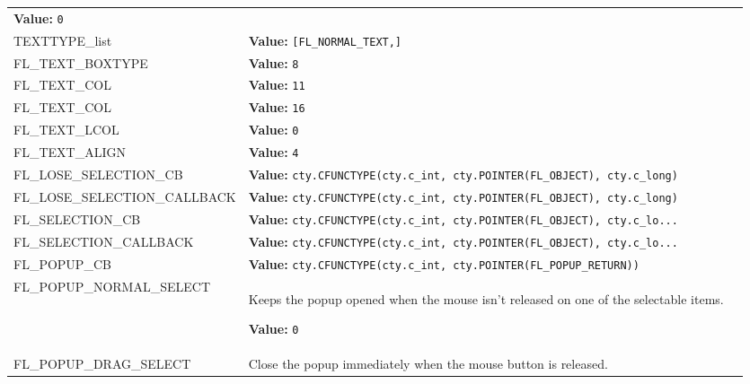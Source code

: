 \begin{longtable}{|p{\varnamewidth}|p{\vardescrwidth}|l}
\textbf{Value:} 
{\tt 0}&\\
\cline{1-2}
\raggedright T\-E\-X\-T\-T\-Y\-P\-E\-\_\-l\-i\-s\-t\- & \raggedright \textbf{Value:} 
{\tt [FL\_NORMAL\_TEXT,]}&\\
\cline{1-2}
\raggedright F\-L\-\_\-T\-E\-X\-T\-\_\-B\-O\-X\-T\-Y\-P\-E\- & \raggedright \textbf{Value:} 
{\tt 8}&\\
\cline{1-2}
\raggedright F\-L\-\_\-T\-E\-X\-T\-\_\-C\-O\-L\-1\- & \raggedright \textbf{Value:} 
{\tt 11}&\\
\cline{1-2}
\raggedright F\-L\-\_\-T\-E\-X\-T\-\_\-C\-O\-L\-2\- & \raggedright \textbf{Value:} 
{\tt 16}&\\
\cline{1-2}
\raggedright F\-L\-\_\-T\-E\-X\-T\-\_\-L\-C\-O\-L\- & \raggedright \textbf{Value:} 
{\tt 0}&\\
\cline{1-2}
\raggedright F\-L\-\_\-T\-E\-X\-T\-\_\-A\-L\-I\-G\-N\- & \raggedright \textbf{Value:} 
{\tt 4}&\\
\cline{1-2}
\raggedright F\-L\-\_\-L\-O\-S\-E\-\_\-S\-E\-L\-E\-C\-T\-I\-O\-N\-\_\-C\-B\- & \raggedright \textbf{Value:} 
{\tt cty.CFUNCTYPE(cty.c\_int, cty.POINTER(FL\_OBJECT), cty.c\_long)}&\\
\cline{1-2}
\raggedright F\-L\-\_\-L\-O\-S\-E\-\_\-S\-E\-L\-E\-C\-T\-I\-O\-N\-\_\-C\-A\-L\-L\-B\-A\-C\-K\- & \raggedright \textbf{Value:} 
{\tt cty.CFUNCTYPE(cty.c\_int, cty.POINTER(FL\_OBJECT), cty.c\_long)}&\\
\cline{1-2}
\raggedright F\-L\-\_\-S\-E\-L\-E\-C\-T\-I\-O\-N\-\_\-C\-B\- & \raggedright \textbf{Value:} 
{\tt cty.CFUNCTYPE(cty.c\_int, cty.POINTER(FL\_OBJECT), cty.c\_lo\texttt{...}}&\\
\cline{1-2}
\raggedright F\-L\-\_\-S\-E\-L\-E\-C\-T\-I\-O\-N\-\_\-C\-A\-L\-L\-B\-A\-C\-K\- & \raggedright \textbf{Value:} 
{\tt cty.CFUNCTYPE(cty.c\_int, cty.POINTER(FL\_OBJECT), cty.c\_lo\texttt{...}}&\\
\cline{1-2}
\raggedright F\-L\-\_\-P\-O\-P\-U\-P\-\_\-C\-B\- & \raggedright \textbf{Value:} 
{\tt cty.CFUNCTYPE(cty.c\_int, cty.POINTER(FL\_POPUP\_RETURN))}&\\
\cline{1-2}
\raggedright F\-L\-\_\-P\-O\-P\-U\-P\-\_\-N\-O\-R\-M\-A\-L\-\_\-S\-E\-L\-E\-C\-T\- & \raggedright Keeps the popup opened when the mouse isn't released on one of the
selectable items.

\textbf{Value:} 
{\tt 0}&\\
\cline{1-2}
\raggedright F\-L\-\_\-P\-O\-P\-U\-P\-\_\-D\-R\-A\-G\-\_\-S\-E\-L\-E\-C\-T\- & \raggedright Close the popup immediately when the mouse button is released.


\end{longtable}
